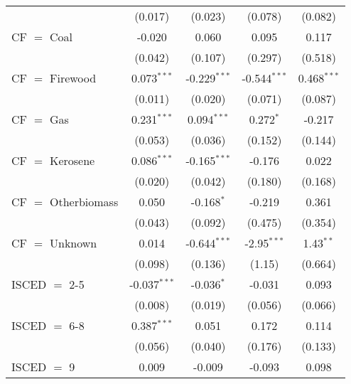 \begin{table}[htbp!]
\begin{adjustbox}{width = 1\textwidth, max height = 0.95\textheight, center}
\begin{threeparttable}[b]
\begin{tabular}{lcccc}
                                 & (0.017)            & (0.023)            & (0.078)        & (0.082)\\   
            CF $=$ Coal          & -0.020             & 0.060              & 0.095          & 0.117\\   
                                 & (0.042)            & (0.107)            & (0.297)        & (0.518)\\   
            CF $=$ Firewood      & 0.073$^{***}$      & -0.229$^{***}$     & -0.544$^{***}$ & 0.468$^{***}$\\   
                                 & (0.011)            & (0.020)            & (0.071)        & (0.087)\\   
            CF $=$ Gas           & 0.231$^{***}$      & 0.094$^{***}$      & 0.272$^{*}$    & -0.217\\   
                                 & (0.053)            & (0.036)            & (0.152)        & (0.144)\\   
            CF $=$ Kerosene      & 0.086$^{***}$      & -0.165$^{***}$     & -0.176         & 0.022\\   
                                 & (0.020)            & (0.042)            & (0.180)        & (0.168)\\   
            CF $=$ Otherbiomass  & 0.050              & -0.168$^{*}$       & -0.219         & 0.361\\   
                                 & (0.043)            & (0.092)            & (0.475)        & (0.354)\\   
            CF $=$ Unknown       & 0.014              & -0.644$^{***}$     & -2.95$^{***}$  & 1.43$^{**}$\\   
                                 & (0.098)            & (0.136)            & (1.15)         & (0.664)\\   
            ISCED $=$ 2-5        & -0.037$^{***}$     & -0.036$^{*}$       & -0.031         & 0.093\\   
                                 & (0.008)            & (0.019)            & (0.056)        & (0.066)\\   
            ISCED $=$ 6-8        & 0.387$^{***}$      & 0.051              & 0.172          & 0.114\\   
                                 & (0.056)            & (0.040)            & (0.176)        & (0.133)\\   
            ISCED $=$ 9          & 0.009              & -0.009             & -0.093         & 0.098\\   

\end{tabular}
\end{threeparttable}
\end{adjustbox}
\end{table}
